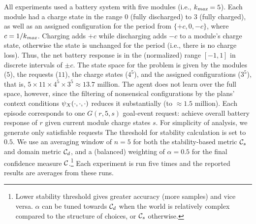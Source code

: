All experiments used a battery system with five modules (i.e., $k_{\operatorname{\textit{max}}}=5$). 
%
Each module had a charge state in the range $0$ (fully discharged) to $3$ (fully charged), as well as an assigned configuration for the period from $\{+c, 0, -c\}$, where $c=1/k_{\operatorname{\textit{max}}}$.
%
%
Charging adds $+c$ while discharging adds $-c$ to a module's charge state, otherwise the state is unchanged for the period (i.e., there is no charge loss). Thus, the net battery response is in the (normalized) range $[-1,1]$ in discrete intervals of $\pm c$. The state space for the problem is given by the modules ($5$), the requests ($11$), the charge states ($4^5$), and the assigned configurations ($3^5$), that is, $5 \times 11 \times 4^5 \times 3^5 \approx 13.7$ million. The agent does not learn over the full space, however, since the filtering of nonsensical configurations by the plans' context conditions $\psi_X(\cdot,\cdot,\cdot)$ reduces it substantially (to $\approx1.5$ million).
%
Each episode corresponds to one $G(r,5,s)$ goal-event request: achieve overall battery response of $r$ given current module charge states $s$.  For simplicity of analysis, we generate only satisfiable requests
The threshold for stability calculation is set to $0.5$. We use an averaging window of $n=5$ for both the stability-based metric ${\mathcal{C}}_s$ and domain metric ${\mathcal{C}}_d$, and a (balanced) weighting of $\alpha=0.5$ for the final confidence measure ${\mathcal{C}}$.\footnote{Lower stability threshold gives greater accuracy (more samples) and vice versa. 
$\alpha$ can be tuned towards ${\mathcal{C}}_d$ when the world is relatively complex compared to the structure of choices, or ${\mathcal{C}}_s$ otherwise.
} Each experiment is run five times and the reported results are averages from these runs. 
%
